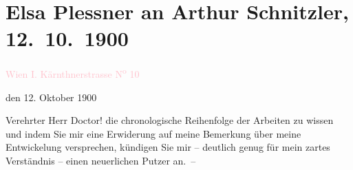 

\renewcommand{\erwaehntePersonen}{Personen:  ,  ,  ,  ,  ,  ,  ,  , Rosine Hutzler, Josef Kainz, Sara Kainz, Elsa Plessner, Louis Plessner, Jolantha Ramazetta, Lajos Stael-Dergy, Louis Stael-Dergy}
\renewcommand{\erwaehnteInstitutionen}{Institutionen: Deutsches Theater Berlin, Volkstheater}
\renewcommand{\erwaehnteOrte}{Orte: Berlin, Budapest, Kärntner Straße 10, Meran, Paris, Sankt Petersburg, Ungarn, Volkstheater, Wien}
\renewcommand{\erwaehnteWerke}{Werke: Am Wege, Anatol, Baby, Berliner Börsen-Courier, Das erste Kapitel. Schauspiel in drei Akten, Der Begräbnißtag, Der Herr Cassenchef, Der gläserne Käfig. Eine Parabel, Der gläserne Käfig. Skizzen und Novellen, Der neue Lehrer. Novelle, Die Ehrlosen. Schauspiel in drei Acten, Die Ehrlosen. Schauspiel in drei Acten, Die Leiter der Seele, Ein Brief, Im Feuer geprüft, Im Widerschein, Meine Freundin Clotilde, Neues Wiener Tagblatt, Reminiscenz, Theater, Kunst und Literatur. Deutsches Volkstheater, Warten, Warum}
\section[Elsa Plessner an Arthur Schnitzler, 12. 10. 1900]{Elsa Plessner an Arthur Schnitzler, 12. 10. 1900}
\nopagebreak{}
\rehead{ }\normalsize\beginnumbering{}
\toendnotes[C]{\smallbreak\pagebreak[2]}
\toendnotes[C]{\smallbreak}
\pstart
           {\pb}\textcolor{pink}{Wien I. Kärnthnerstrasse N\textsuperscript{o} 10}{}\ledrightnote{\textcolor{pink}{Kärntner Straße 10}}\pend
           
\pstart
           \raggedleft{}den 12. Oktober 1900\pend
           
\pstart{}Verehrter Herr Doctor!\pend\vspace{0.5em}
\pstart
           \label{K_L03728-1v}\label{} die chronologische Reihenfolge der Arbeiten zu wissen und indem Sie mir
               eine Erwiderung auf meine Bemerkung über meine Entwickelung versprechen, kündigen
               Sie mir – deutlich genug für mein zartes Verständnis – einen neuerlichen Putzer
               an. – \pend
           
